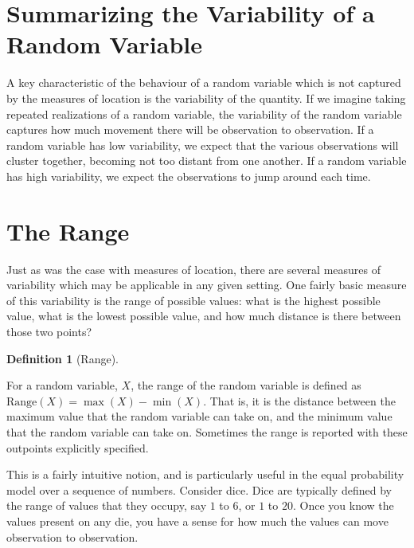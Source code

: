 \documentclass[
  letterpaper,
  DIV=11,
  numbers=noendperiod]{scrreprt}
\theoremstyle{definition}
\theoremstyle{definition}
\theoremstyle{definition}
\newtheorem{definition}{Definition}[chapter]
\theoremstyle{remark}
\begin{document}

\section{Summarizing the Variability of a Random
Variable}\label{summarizing-the-variability-of-a-random-variable}

A key characteristic of the behaviour of a random variable which is not
captured by the measures of location is the variability of the quantity.
If we imagine taking repeated realizations of a random variable, the
variability of the random variable captures how much movement there will
be observation to observation. If a random variable has low variability,
we expect that the various observations will cluster together, becoming
not too distant from one another. If a random variable has high
variability, we expect the observations to jump around each time.

\section{The Range}\label{the-range}

Just as was the case with measures of location, there are several
measures of variability which may be applicable in any given setting.
One fairly basic measure of this variability is the range of possible
values: what is the highest possible value, what is the lowest possible
value, and how much distance is there between those two points?

\begin{definition}[Range]\protect\hypertarget{def-range}{}\label{def-range}

For a random variable, \(X\), the range of the random variable is
defined as \(\text{Range}(X) = \max(X) - \min(X)\). That is, it is the
distance between the maximum value that the random variable can take on,
and the minimum value that the random variable can take on. Sometimes
the range is reported with these outpoints explicitly specified.

\end{definition}

This is a fairly intuitive notion, and is particularly useful in the
equal probability model over a sequence of numbers. Consider dice. Dice
are typically defined by the range of values that they occupy, say \(1\)
to \(6\), or \(1\) to \(20\). Once you know the values present on any
die, you have a sense for how much the values can move observation to
observation.
\end{document}
